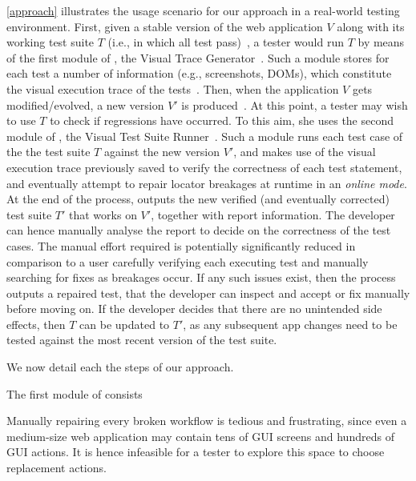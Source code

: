 \autoref{approach} illustrates the usage scenario for our approach in a real-world testing environment. 
First, given a stable version of the web application $V$ along with its working test suite $T$ (i.e., in which all test pass)~, a tester would run $T$ by means of the first module of \tool, the Visual Trace Generator~. Such a module stores for each test a number of information (e.g., screenshots, DOMs), which constitute the visual execution trace of the tests~. 
Then, when the application $V$ gets modified/evolved, a new version $V'$ is produced~. At this point, a tester may wish to use $T$ to check if regressions have occurred. To this aim, she uses the second module of \tool, the Visual Test Suite Runner~. Such a module runs each test case of the the test suite $T$ against the new version $V'$, and makes use of the visual execution trace previously saved to verify the correctness of each test statement, and eventually attempt to repair locator breakages at runtime in an \textit{online mode}. At the end of the process, \tool outputs the new verified (and eventually corrected) test suite $T'$ that works on $V'$, together with report information. 
The developer can hence manually analyse the report to decide on the correctness of the test cases. The manual effort required is potentially significantly reduced in comparison to a user carefully verifying each executing test and manually searching for fixes as breakages occur. If any such issues exist, then the process outputs a repaired test, that the developer can inspect and accept or fix  manually before moving on. If the developer decides that there are no unintended side effects, then $T$ can
be updated to $T'$, as any subsequent app changes need to be tested against the most recent version of the test suite.

We now detail each the steps of our approach.


The first module of \tool consists 



Manually repairing every broken workflow is tedious and frustrating, since even a medium-size web application may contain tens of GUI screens and hundreds of GUI actions. It is hence infeasible for a tester to explore this space to choose replacement actions.


